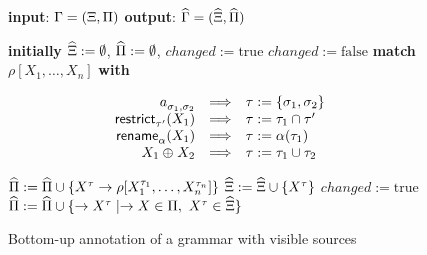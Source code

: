 \begin{textAtEnd}[category=initial]
\begin{figure}
  {\small\begin{algorithmic}[0]
    \STATE \textbf{input}: $\Gamma=(\Xi,\Pi)$
    \STATE \textbf{output}: $\widehat{\Gamma}=(\widehat{\Xi}, \widehat{\Pi})$
  \end{algorithmic}}
  {\small\begin{algorithmic}[1]
    \STATE \textbf{initially} $\widehat{\Xi} := \emptyset$, 
    $\widehat{\Pi} := \emptyset$, 
    $\mathit{changed} := \mathrm{true}$
    \STATE $\mathit{changed} := \mathrm{false}$
    \STATE \textbf{match} $\rho[X_1,\ldots,X_n]$ \textbf{with}
    \Statex \begin{minipage}{5cm}
      \vspace*{-\baselineskip}
      \[
      \begin{array}{rcl}
        {a}^{}_{{\sigma_1},{\sigma_2}} & \Longrightarrow & \tau := {\{ {\sigma_1,\sigma_2} \}} \\
        \mathsf{restrict}^{}_{{\tau'}}(X_1) & \Longrightarrow & \tau := \tau_1 \cap \tau' \\
        \mathsf{rename}^{}_{{\alpha}}(X_1) & \Longrightarrow & \tau := \alpha(\tau_1) \\
        X_1 \oplus^{} X_2 & \Longrightarrow & \tau := \tau_1 \cup \tau_2
      \end{array}
      \]
    \end{minipage}
    \STATE $\widehat{\Pi} := \widehat{\Pi} \cup {\{ {X^\tau\rightarrow \rho[X_1^{\tau_1}, \ldots, X_n^{\tau_n}]} \}}$ \label{line:insert-rule}
    \STATE $\widehat{\Xi} := \widehat{\Xi} \cup {\{ {X^\tau} \}}$
    \STATE $\mathit{changed} := \mathrm{true}$
    \ENDIF
    \ENDFOR
    \STATE $\widehat{\Pi} := \widehat{\Pi} \cup {\{ {\rightarrow X^\tau\mid \rightarrow X \in \Pi,~ X^\tau\in \widehat{\Xi}} \}}$ \label{line:insert-axiom}
    \ENDWHILE
  \end{algorithmic}}
  \caption{Bottom-up annotation of a grammar with visible sources}
  \label{fig:annotation}
\end{figure}


\end{textAtEnd}
